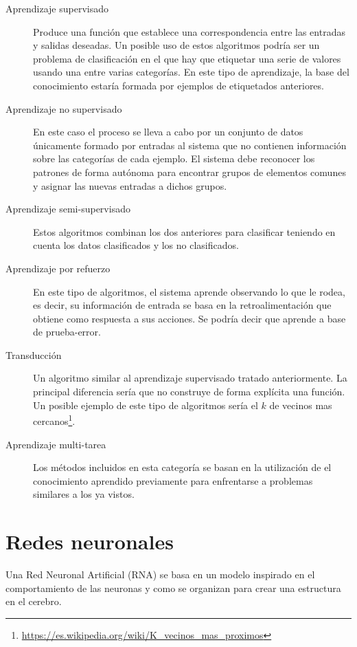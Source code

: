 \begin{description}
    \item[Aprendizaje supervisado] Produce una función que establece una correspondencia entre las entradas y salidas deseadas. Un posible uso de estos algoritmos podría ser un problema de clasificación en el que hay que etiquetar una serie de valores usando una entre varias categorías. En este tipo de aprendizaje, la base del conocimiento estaría formada por ejemplos de etiquetados anteriores.
    
    \newpage
    
    \item[Aprendizaje no supervisado] En este caso el proceso se lleva a cabo por un conjunto de datos únicamente formado por entradas al sistema que no contienen información sobre las categorías de cada ejemplo. El sistema debe reconocer los patrones de forma autónoma para encontrar grupos de elementos comunes y asignar las nuevas entradas a dichos grupos.
    \item[Aprendizaje semi-supervisado] Estos algoritmos combinan los dos anteriores para clasificar teniendo en cuenta los datos clasificados y los no clasificados.
    \item[Aprendizaje por refuerzo] En este tipo de algoritmos, el sistema aprende observando lo que le rodea, es decir, su información de entrada se basa en la retroalimentación que obtiene como respuesta a sus acciones. Se podría decir que aprende a base de prueba-error.
    \item[Transducción] Un algoritmo similar al aprendizaje supervisado tratado anteriormente. La principal diferencia sería que no construye de forma explícita una función. Un posible ejemplo de este tipo de algoritmos sería el $k$ de vecinos mas cercanos\footnote{\url{https://es.wikipedia.org/wiki/K\_vecinos\_mas\_proximos}}.
    \item[Aprendizaje multi-tarea] Los métodos incluidos en esta categoría se basan en la utilización de el conocimiento aprendido previamente para enfrentarse a problemas similares a los ya vistos.
\end{description}

\section{Redes neuronales}
Una Red Neuronal Artificial (RNA) se basa en un modelo inspirado en el comportamiento de las neuronas y como se organizan para crear una estructura en el cerebro.

